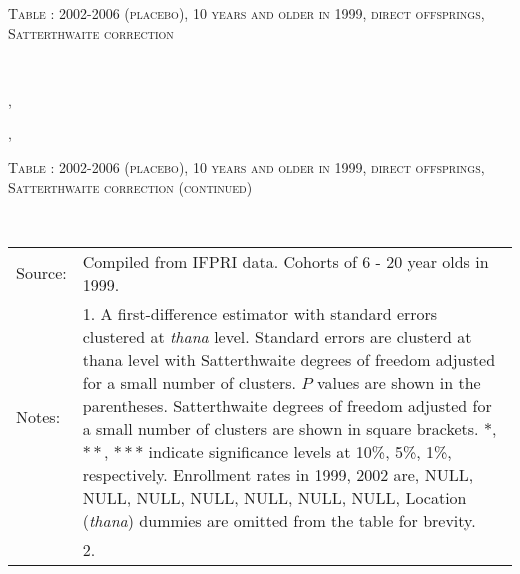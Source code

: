 \begin{table}\hfil\textsc{\footnotesize Table \thetable:  2002-2006 (placebo), 10 years and older in 1999, direct offsprings, Satterthwaite correction\label{zEm.1999.10.sameN}}\\\setlength{\tabcolsep}{1pt}\renewcommand{\arraystretch}{.675}\hspace{-2em}\hfil{}\\\renewcommand{\arraystretch}{1}\end{table}, \addtocounter{table}{-1}, \begin{table}\hfil\textsc{\footnotesize Table \thetable:  2002-2006 (placebo), 10 years and older in 1999, direct offsprings, Satterthwaite correction (continued)\label{zEm.1999.10.sameN}}\\\setlength{\tabcolsep}{1pt}\renewcommand{\arraystretch}{.675}\hspace{-2em}\hfil{}\\\renewcommand{\arraystretch}{1}\hfil\begin{tabular}{>{\hfill\scriptsize}p{1cm}<{}>{\scriptsize}p{12cm}<{\hfill}} Source:& Compiled from IFPRI data. Cohorts of 6 - 20 year olds in 1999. \\[-1ex] Notes:& 1. A first-difference estimator with standard errors clustered at \textit{thana} level. Standard errors are clusterd at thana level with Satterthwaite degrees of freedom adjusted for a small number of clusters. $P$ values are shown in the parentheses. Satterthwaite degrees of freedom adjusted for a small number of clusters are shown in square brackets. $*$, $**$, $***$ indicate significance levels at 10\%, 5\%, 1\%, respectively. Enrollment rates in 1999, 2002 are, NULL, NULL, NULL, NULL, NULL, NULL, NULL, Location (\textit{thana}) dummies are omitted from the table for brevity. \\ & 2.   \end{tabular} \end{table}
\clearpage

